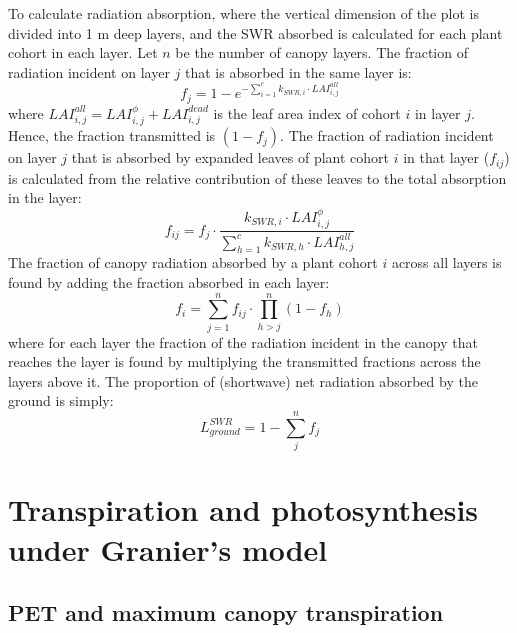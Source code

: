 \documentclass[]{book}
\begin{document}
To calculate radiation absorption, where the vertical dimension of the plot is
divided into 1 m deep layers, and the SWR absorbed is calculated for each plant
cohort in each layer. Let \(n\) be the number of canopy layers. The fraction of
radiation incident on layer \(j\) that is absorbed in the same layer is:
\begin{equation}
f_j=1 - e^{-\sum_{i=1}^{c}{k_{SWR,i} \cdot LAI_{i,j}^{all}}}
\end{equation}
where \(LAI_{i,j}^{all} = LAI_{i,j}^{\phi}+LAI_{i,j}^{dead}\) is the leaf area
index of cohort \(i\) in layer \(j\). Hence, the fraction transmitted is \((1-f_j)\).
The fraction of radiation incident on layer \(j\) that is absorbed by expanded leaves
of plant cohort \(i\) in that layer (\(f_{ij}\)) is calculated from the relative
contribution of these leaves to the total absorption in the layer:
\begin{equation}
f_{ij} = f_j \cdot \frac{k_{SWR,i}\cdot LAI_{i,j}^{\phi}}{\sum_{h=1}^{c}{k_{SWR,h} \cdot LAI_{h,j}^{all}}}
\end{equation}
The fraction of canopy radiation absorbed by a plant cohort \(i\) across all layers
is found by adding the fraction absorbed in each layer:
\begin{equation}
f_i = \sum_{j=1}^{n}{f_{ij}\cdot \prod_{h>j}^{n}{(1-f_h)}}
\end{equation}
where for each layer the fraction of the radiation incident in the canopy that
reaches the layer is found by multiplying the transmitted fractions across the
layers above it. The proportion of (shortwave) net radiation absorbed by the
ground is simply:
\begin{equation}
L^{SWR}_{ground} = 1 - \sum_{j}^{n}{f_j}
\end{equation}

\hypertarget{transpirationgranier}{%
\chapter{Transpiration and photosynthesis under Granier's model}\label{transpirationgranier}}

\hypertarget{pet-and-maximum-canopy-transpiration}{%
\section{PET and maximum canopy transpiration}\label{pet-and-maximum-canopy-transpiration}}
\end{document}
